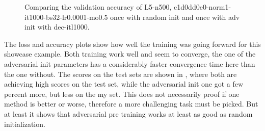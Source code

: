 \begin{figure}[!ht]
  \centering
  \caption{Comparing the validation accuracy of L5-n500, c1d0dd0e0-norm1-it1000-bs32-lr0.0001-mo0.5 once with random init and once with adv init with dec-itl1000.}
  \label{fig:exp_adv_fc3_val_acc}
\end{figure}
\FloatBarrier
\noindent

The loss and accuracy plots show how well the training was going forward for this showcase example. Both training work well and seem to converge, the one of the adversarial init parameters has a considerably faster convergence time here than the one without.
The scores on the test sets are shown in , where both are achieving high scores on the test set, while the adversarial init one got a few percent more, but less on the my set.
This does not necessarily proof if one method is better or worse, therefore a more challenging task must be picked.
But at least it shows that adversarial pre training works at least as good as random initialization.

